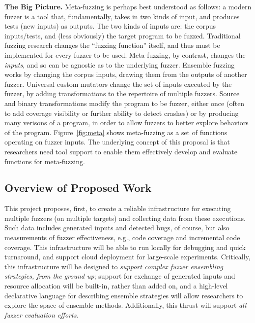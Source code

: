 \vspace{1ex}
\noindent\textbf{The Big Picture.}  Meta-fuzzing is perhaps best understood
as follows: a modern fuzzer is a tool that, fundamentally, takes in
two kinds of input, and produces tests (new inputs) as outputs.  The
two kinds of inputs are:  the corpus inputs/tests, and (less
obviously) the target program to be fuzzed.
Traditional fuzzing research changes the ``fuzzing function''
itself, and thus must be implemented for every fuzzer to be
used. Meta-fuzzing, by contrast, changes the \emph{inputs}, and so can
be agnostic as to the underlying fuzzer.   Ensemble fuzzing works by
changing the corpus inputs, drawing them from the outputs of another
fuzzer.  Universal custom mutators change the set of
inputs executed by the fuzzer, by adding transformations to the
repertoire of multiple fuzzers.  Source and binary transformations
modify the program to be fuzzer, either once (often to add coverage
visibility or further ability to detect crashes) or by producing many
verisons of a program, in order to allow fuzzers to better explore
behaviors of the program.  Figure~\ref{fig:meta} shows meta-fuzzing as
a set of functions operating on fuzzer inputs.  The underlying concept
of this proposal is that researchers need tool support to enable them
effectively develop and evaluate functions for meta-fuzzing.




\subsection{Overview of Proposed Work}

This project proposes, first, to create a reliable infrastructure for executing 
multiple fuzzers (on multiple targets) and collecting data from these executions. 
 Such data includes generated inputs and detected bugs, of course, but also 
measurements of fuzzer effectiveness, e.g., code coverage and 
incremental code coverage.  This infrastructure will be able to run locally for 
debugging and quick turnaround, and support cloud deployment for 
large-scale experiments. Critically, this infrastructure will be designed to 
\emph{support complex fuzzer ensembling strategies, from the ground up}; 
support for exchange of generated inputs and resource allocation will 
be built-in, rather than added on, and a high-level declarative language for 
describing ensemble strategies will allow researchers to explore the space of 
ensemble methods.  Additionally, this thrust will support
\emph{all fuzzer evaluation efforts}.

